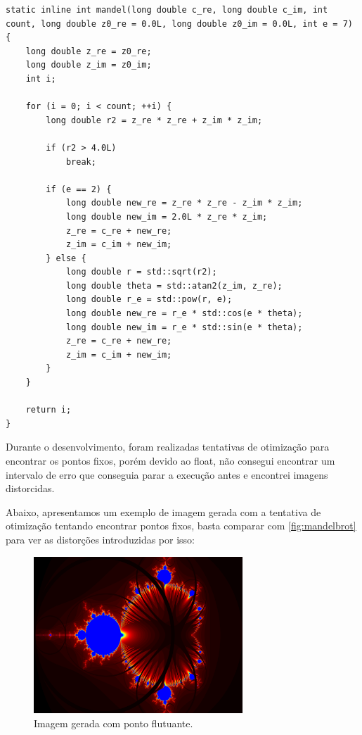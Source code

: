\begin{lstlisting}[caption=Kernel do cálculo do conjunto de Mandelbrot]
static inline int mandel(long double c_re, long double c_im, int count, long double z0_re = 0.0L, long double z0_im = 0.0L, int e = 7)
{
    long double z_re = z0_re;
    long double z_im = z0_im;
    int i;

    for (i = 0; i < count; ++i) {
        long double r2 = z_re * z_re + z_im * z_im;

        if (r2 > 4.0L)
            break;

        if (e == 2) {
            long double new_re = z_re * z_re - z_im * z_im;
            long double new_im = 2.0L * z_re * z_im;
            z_re = c_re + new_re;
            z_im = c_im + new_im;
        } else {
            long double r = std::sqrt(r2);
            long double theta = std::atan2(z_im, z_re);
            long double r_e = std::pow(r, e);
            long double new_re = r_e * std::cos(e * theta);
            long double new_im = r_e * std::sin(e * theta);
            z_re = c_re + new_re;
            z_im = c_im + new_im;
        }
    }

    return i;
}
\end{lstlisting}

Durante o desenvolvimento, foram realizadas tentativas de otimização para encontrar os pontos fixos, porém devido ao float, não consegui encontrar um intervalo de erro que conseguia parar a execução antes e encontrei imagens distorcidas.

Abaixo, apresentamos um exemplo de imagem gerada com a tentativa de otimização tentando encontrar pontos fixos, basta comparar com \autoref{fig:mandelbrot} para ver as distorções introduzidas por isso:
\begin{figure}[H]
    \centering
    \includegraphics[width=0.7\textwidth]{figures/comparacao/mandelbrot_float.png}
    \caption{Imagem gerada com ponto flutuante.}
    \label{fig:comparison_float}
\end{figure}

